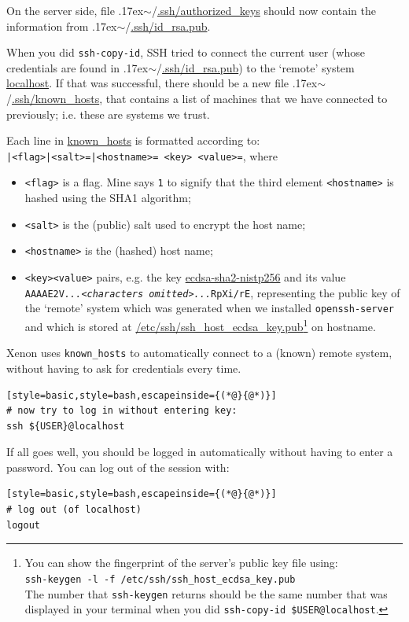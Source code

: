 \documentclass[12pt, a4paper, twoside, openany, titlepage]{book}
\newcommand{\mytilde}{\raise.17ex\hbox{$\scriptstyle\sim$}}
\begin{document}
On the server side, file \mytilde/\url{.ssh/authorized_keys} should now contain the information from \mytilde/\mbox{\url{.ssh/id_rsa.pub}}.



When you did \texttt{ssh-copy-id}, SSH tried to connect the current user (whose credentials are found in \mytilde/\url{.ssh/id_rsa.pub}) to the `remote' system \url{localhost}. If that was successful, there should be a new file \mytilde/\url{.ssh/known_hosts}, that contains a list of machines that we have connected to previously; i.e. these are systems we trust.

Each line in  \url{known_hosts} is formatted according to: \\
\texttt{|<flag>|<salt>=|<hostname>= <key> <value>=}, where
\begin{itemize}
\item{\texttt{<flag>} is a flag. Mine says \texttt{1} to signify that the third element \texttt{<hostname>} is hashed using the SHA1 algorithm;}
\item{\texttt{<salt>} is the (public) salt used to encrypt the host name;}
\item{\texttt{<hostname>} is the (hashed) host name;}
\item{\texttt{<key>}\texttt{<value>} pairs, e.g. the key \url{ecdsa-sha2-nistp256} and its value\\ \texttt{AAAAE2V\textit{...<characters omitted>...}RpXi/rE}, representing the public key of the `remote' system which was generated when we installed \texttt{openssh-server} and which is stored at \url{/etc/ssh/ssh_host_ecdsa_key.pub}\footnote{You can show the fingerprint of the server's public key file using:\\
\texttt{ssh-keygen -l -f /etc/ssh/ssh\_host\_ecdsa\_key.pub}\\
The number that \texttt{ssh-keygen} returns should be the same number that was displayed in your terminal when you did \texttt{ssh-copy-id \${USER}@localhost}.} on hostname.}
\end{itemize}
Xenon uses \texttt{known\_hosts} to automatically connect to a (known) remote system, without having to ask for credentials every time.

\begin{lstlisting}[style=basic,style=bash,escapeinside={(*@}{@*)}]
# now try to log in without entering key:
ssh ${USER}@localhost
\end{lstlisting} %
If all goes well, you should be logged in automatically without having to enter a password. You can log out of the session with:
\begin{lstlisting}[style=basic,style=bash,escapeinside={(*@}{@*)}]
# log out (of localhost)
logout
\end{lstlisting}
\end{document}
